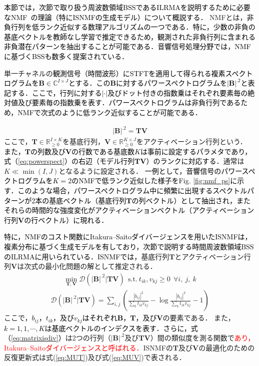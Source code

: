 \textcolor{black}{本節では，次節で取り扱う周波数領域BSSであるILRMAを説明するために必要なNMF~\cite{NMF}の理論（特にISNMFの生成モデル\cite{isnmf}）について概説する．}
NMFとは，\textcolor{black}{非負行列を低ランク近似する数理アルゴリズムの一つである．特に，少数の非負の基底ベクトルを教師なし学習で推定できるため，観測された非負行列に含まれる非負潜在パターンを抽出することが可能である．音響信号処理分野では，NMFに基づくBSSも数多く提案されている\cite{singlechsep, supNMF, MNMF_oz, iwase}．}

単一チャネルの\textcolor{black}{観測信号（時間波形）にSTFTを適用して得られる複素スペクトログラムを$\bm{B}\in\mathbb{C}^{I\times J}$とする．この$\bm{B}$に対するパワースペクトログラムを$|\bm{B}|^{.2}$と表記する．ここで，行列に対する$|\cdot|$及びドット付きの指数乗はそれぞれ要素毎の絶対値及び要素毎の指数乗を表す．パワースペクトログラムは非負行列であるため，NMFで次式のように低ランク近似することが可能である．}

\begin{align}
    |\bm{B}|^{.2} = \bm{TV}　\label{eq:powerspect}
\end{align}
ここで，$\bm{T} \in \mathbb{R}^{I \times K}_{\geq 0}$を基底行列，$\bm{V} \in \mathbb{R}^{K \times J}_{\geq 0}$をアクティベーション行列という．
\textcolor{black}{また，$\bm{T}$の列数及び$\bm{V}$の行数である基底数$K$は事前に設定するパラメタであり，式（\ref{eq:powerspect}）の右辺（モデル行列$\bm{TV}$）のランクに対応する．}通常は$K \ll \min (I,J)$となるように設定される．
\textcolor{black}{一例として，音響信号のパワースペクトログラムを$K=2$のNMFで低ランク近似した様子をFig. \ref{fig:nmf_ps}に示す．このような場合，パワースペクトログラム中に頻繁に出現するスペクトルパターンが2本の基底ベクトル（基底行列$\bm{T}$の列ベクトル）として抽出され，またそれらの時間的な強度変化がアクティベーションベクトル（アクティベーション行列$\bm{V}$の行ベクトル）に現れる．}

\textcolor{black}{特に，NMFのコスト関数にItakura--Saitoダイバージェンスを用いたISNMF\cite{isnmf}は，複素分布に基づく生成モデル\cite{GGD}を有しており，次節で説明する時間周波数領域BSSのILRMAに用いられている．ISNMFでは，}基底行列$\bm{T}$とアクティベーション行列$\bm{V}$は次式の最小化問題の解として推定される．
\begin{align}
    \min_{\bm{T,V}} \mathcal{D}(|\bm{B}|^{.2} | \bm{TV}) ~~\mathrm{s.t.} ~ t_{ik}, v_{kj} \geq 0 ~~\forall i,~j,~k
\end{align}
\begin{align}
    \mathcal{D}(|\bm{B}|^{.2}|\bm{TV}) = \sum_{i,j}\left( \frac{ |b_{ij}|^2 }{ \sum_{k}t_{ik}v_{kj} } - \log{\frac{ |b_{ij}|^2 }{ \sum_{k}t_{ik}v_{kj}}} -1 \right) \label{eq:matrixisdiv}
\end{align}
ここで，\textcolor{black}{$b_{ij}$，$t_{ik}$，及び$v_{kj}$はそれぞれ$\bm{B}$，$\bm{T}$，及び$\bm{V}$}の要素である．
また，\textcolor{black}{$k= 1, 1, \cdots, K$は基底ベクトルのインデクスを表す．さらに，式（\ref{eq:matrixisdiv}）}は2つの行列（$|\bm{B}|^{.2}$及び$\bm{TV}$）間の類似度を測る関数で\textcolor{red}{あり，Itakura--Saitoダイバージェンスと呼ばれる．}ISNMFの$\bm{T}$及び$\bm{V}$の最適化のための反復更新式は式(\ref{eq:MUT})及び式(\ref{eq:MUV})で表される\cite{MU}．

